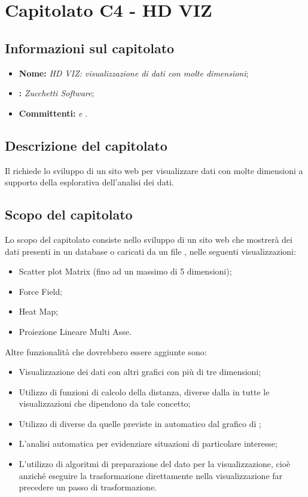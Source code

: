 \section{Capitolato C4 - HD VIZ}\label{C4}
\subsection{Informazioni sul capitolato}
\begin{itemize}
	\item \textbf{Nome:} \textit{HD VIZ: visualizzazione di dati con molte dimensioni};
	\item \textbf{:} \textit{Zucchetti Software};
	\item \textbf{Committenti:} \textit{\VT{} e \CR{}}.
\end{itemize}

\subsection{Descrizione del capitolato}
Il  richiede lo sviluppo di un sito web per visualizzare dati con molte dimensioni a supporto della  esplorativa dell'analisi dei dati.

\subsection{Scopo del capitolato}
Lo scopo del capitolato consiste nello sviluppo di un sito web che mostrerà dei dati presenti in un database o caricati da un file , nelle seguenti visualizzazioni:
\begin{itemize}
	\item Scatter plot Matrix (fino ad un massimo di 5 dimensioni);
	\item Force Field;
	\item Heat Map;
	\item Proiezione Lineare Multi Asse.
\end{itemize}
Altre funzionalità che dovrebbero essere aggiunte sono:
\begin{itemize}
	\item Visualizzazione dei dati con altri grafici con più di tre dimensioni;
	\item Utilizzo di funzioni di calcolo della distanza, diverse dalla  in tutte le visualizzazioni che dipendono da tale concetto;
	\item Utilizzo di  diverse da quelle previste in automatico dal grafico  di ;
	\item L'analisi automatica per evidenziare situazioni di particolare interesse;
	\item L'utilizzo di algoritmi di preparazione del dato per la visualizzazione, cioè anziché eseguire la trasformazione direttamente nella visualizzazione far precedere un passo di trasformazione.
\end{itemize}

